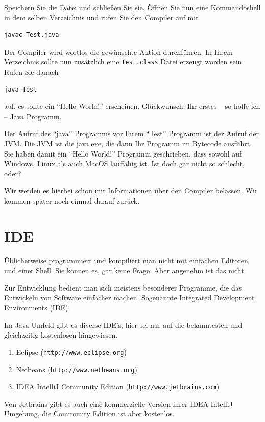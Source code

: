 Speichern Sie die Datei und schließen Sie sie. Öffnen Sie nun eine Kommandoshell in dem selben Verzeichnis und rufen Sie den Compiler auf mit 
\begin{Verbatim}
javac Test.java
\end{Verbatim}
Der Compiler wird wortlos die gewünschte Aktion durchführen. In Ihrem Verzeichnis sollte nun zusätzlich eine \texttt{Test.class} Datei erzeugt worden sein. Rufen Sie danach 
\begin{Verbatim}
java Test
\end{Verbatim}
auf, es sollte ein "`Hello World!"' erscheinen. Glückwunsch: Ihr erstes -- so hoffe ich -- Java Programm.

Der Aufruf des "`java"' Programms vor Ihrem "`Test"' Programm ist der Aufruf der JVM. Die JVM ist die java.exe, die dann Ihr Programm im Bytecode ausführt. Sie haben damit ein "`Hello World!"' Programm geschrieben, dass sowohl auf Windows, Linux als auch MacOS lauffähig ist. Ist doch gar nicht so schlecht, oder?

Wir werden es hierbei schon mit Informationen über den Compiler belassen. Wir kommen später noch einmal darauf zurück. 

\section{IDE}

Üblicherweise programmiert und kompiliert man nicht mit einfachen Editoren und einer Shell. Sie können es, gar keine Frage. Aber angenehm ist das nicht. 

Zur Entwicklung bedient man sich meistens besonderer Programme, die das Entwickeln von Software einfacher machen. Sogenannte Integrated Development Environments (IDE). 

Im Java Umfeld gibt es diverse IDE's, hier sei nur auf die bekanntesten und gleichzeitig kostenlosen hingewiesen. 

\begin{enumerate}
\item Eclipse (\texttt{http://www.eclipse.org})
\item Netbeans (\texttt{http://www.netbeans.org})
\item IDEA IntelliJ Community Edition (\texttt{http://www.jetbrains.com})
\end{enumerate}
Von Jetbrains gibt es auch eine kommerzielle Version ihrer IDEA IntelliJ Umgebung, die Community Edition ist aber kostenlos.

